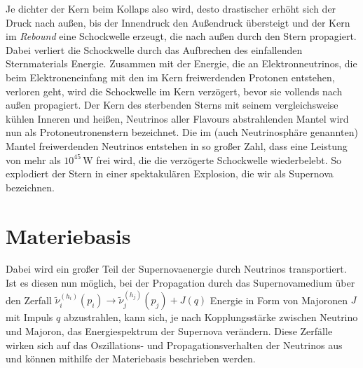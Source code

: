 Je dichter der Kern beim Kollaps also wird, desto drastischer erhöht sich der Druck nach außen, bis der Innendruck den Außendruck übersteigt und der Kern im \textit{Rebound} eine Schockwelle erzeugt, die nach außen durch den Stern propagiert.
Dabei verliert die Schockwelle durch das Aufbrechen des einfallenden Sternmaterials Energie.
Zusammen mit der Energie, die an Elektronneutrinos, die beim Elektroneneinfang mit den im Kern freiwerdenden Protonen entstehen, verloren geht, wird die Schockwelle im Kern verzögert, bevor sie vollends nach außen propagiert.
Der Kern des sterbenden Sterns mit seinem vergleichsweise kühlen Inneren und heißen, Neutrinos aller Flavours abstrahlenden Mantel wird nun als Protoneutronenstern bezeichnet.
Die im (auch Neutrinosphäre genannten) Mantel freiwerdenden Neutrinos entstehen in so großer Zahl, dass eine Leistung von mehr als $10^{45} \,\si{\watt}$ \cite{supernovaepaper} frei wird, die die verzögerte Schockwelle wiederbelebt.
So explodiert der Stern in einer spektakulären Explosion, die wir als Supernova bezeichnen.

\section{Materiebasis} %
\label{subsec:materiebasis}

Dabei wird ein großer Teil der Supernovaenergie durch Neutrinos transportiert.
Ist es diesen nun möglich, bei der Propagation durch das Supernovamedium über den Zerfall $\tilde{\nu}^{(h_i)}_i (p_i) \rightarrow \tilde{\nu}^{(h_j)}_j (p_j) + J(q)$
Energie in Form von Majoronen $J$ mit Impuls $q$ abzustrahlen, kann sich, je nach Kopplungsstärke zwischen Neutrino und Majoron, das Energiespektrum der Supernova verändern.
Diese Zerfälle wirken sich auf das Oszillations- und Propagationsverhalten der Neutrinos aus und können mithilfe der Materiebasis beschrieben werden.

